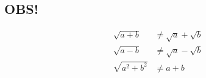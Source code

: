 \subsection{OBS!}
\begin{align*}
\sqrt{a+b}&\neq \sqrt{a}+\sqrt{b}\\
\sqrt{a-b}&\neq \sqrt{a}-\sqrt{b}\\
\sqrt{a^2+b^2}&\neq a+b
\end{align*}
